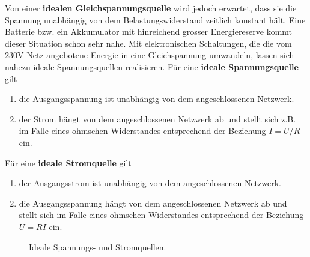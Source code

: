 Von einer \textbf{idealen Gleichspannungsquelle} wird jedoch erwartet, dass sie die Spannung unabhängig von dem Belastungswiderstand zeitlich konstant hält. Eine Batterie bzw. ein Akkumulator mit hinreichend grosser Energiereserve kommt dieser Situation schon sehr nahe. Mit elektronischen Schaltungen, die die vom 230V-Netz angebotene Energie in eine Gleichspannung  umwandeln, lassen sich nahezu ideale Spannungsquellen realisieren.
\newline\newline  
Für eine \textbf{ideale Spannungsquelle} gilt
\begin{enumerate}[$(i)$]
\item die Ausgangsspannung ist unabhängig von dem angeschlossenen Netzwerk.
\item der Strom hängt von dem angeschlossenen Netzwerk ab und stellt sich z.B. im Falle eines ohmschen Widerstandes entsprechend der Beziehung $I=U/R$ ein. 
\end{enumerate}
Für eine \textbf{ideale Stromquelle} gilt
\begin{enumerate}[$(i)$]
\item der Ausgangsstrom ist unabhängig von dem angeschlossenen Netzwerk.
\item die Ausgangsspannung hängt von dem angeschlossenen Netzwerk ab und stellt sich im Falle eines ohmschen Widerstandes entsprechend der Beziehung $U=RI$ ein. 
\end{enumerate}
\begin{figure}[H]
\centering
\caption{Ideale Spannungs- und Stromquellen.}
\label{fig_IIId}
\end{figure}
